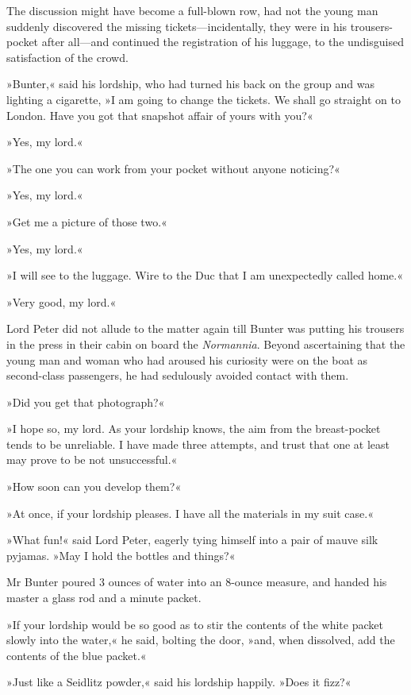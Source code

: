 The discussion might have become a full-blown row, had not the young man suddenly discovered the missing tickets—incidentally, they were in his trousers-pocket after all—and continued the registration of his luggage, to the undisguised satisfaction of the crowd.

»Bunter,« said his lordship, who had turned his back on the group and was lighting a cigarette, »I am going to change the tickets. We shall go straight on to London. Have you got that snapshot affair of yours with you?«

»Yes, my lord.«

»The one you can work from your pocket without anyone noticing?«

»Yes, my lord.«

»Get me a picture of those two.«

»Yes, my lord.«

»I will see to the luggage. Wire to the Duc that I am unexpectedly called home.«

»Very good, my lord.«

Lord Peter did not allude to the matter again till Bunter was putting his trousers in the press in their cabin on board the \textit{Normannia}. Beyond ascertaining that the young man and woman who had aroused his curiosity were on the boat as second-class passengers, he had sedulously avoided contact with them.

»Did you get that photograph?«

»I hope so, my lord. As your lordship knows, the aim from the breast-pocket tends to be unreliable. I have made three attempts, and trust that one at least may prove to be not unsuccessful.«

»How soon can you develop them?«

»At once, if your lordship pleases. I have all the materials in my suit case.«

»What fun!« said Lord Peter, eagerly tying himself into a pair of mauve silk pyjamas. »May I hold the bottles and things?«

Mr Bunter poured 3 ounces of water into an 8-ounce measure, and handed his master a glass rod and a minute packet.

»If your lordship would be so good as to stir the contents of the white packet slowly into the water,« he said, bolting the door, »and, when dissolved, add the contents of the blue packet.«

»Just like a Seidlitz powder,« said his lordship happily. »Does it fizz?«

